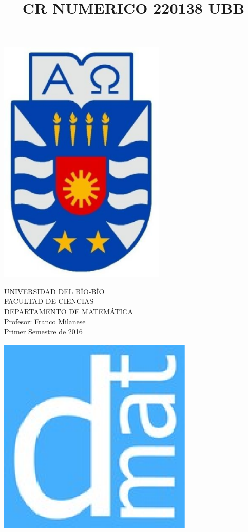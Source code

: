 \documentclass[11pt]{article}
\begin{document}
\title{CR NUMERICO 220138 UBB}

{\begin{minipage}{2cm}
\hspace*{1cm}\includegraphics[width=0.6\textwidth]{escubo-ubb.eps}
\end{minipage}
\begin{minipage}{12cm}
\small
{\bf \rm 
{
\begin{center}
{\footnotesize UNIVERSIDAD DEL B\'IO-B\'IO} \\
{\scriptsize FACULTAD DE CIENCIAS}  \\
{\scriptsize DEPARTAMENTO DE MATEM\'ATICA}  \\
{\scriptsize Profesor:  Franco Milanese}\\
{\scriptsize Primer Semestre de 2016}
\end{center}
}}
\end{minipage}}
{\begin{minipage}{2cm}
\hspace*{-0.5cm}\vspace*{-0.05cm}\includegraphics[width=0.7\textwidth]{escudo-dmat.eps}
\end{minipage}}
\end{document}
